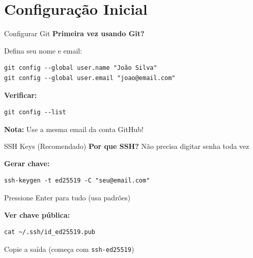 \documentclass[11pt]{beamer}
\begin{document}
\section{Configuração Inicial}

\begin{frame}{Configurar Git}
\textbf{Primeira vez usando Git?}

Defina seu nome e email:

\begin{lstlisting}
git config --global user.name "João Silva"
git config --global user.email "joao@email.com"
\end{lstlisting}

\vspace{0.5cm}

\textbf{Verificar:}
\begin{lstlisting}
git config --list
\end{lstlisting}

\vspace{0.5cm}

\textbf{Nota:} Use a mesma email da conta GitHub!
\end{frame}

\begin{frame}{SSH Keys (Recomendado)}
\textbf{Por que SSH?} Não precisa digitar senha toda vez

\vspace{0.3cm}

\textbf{Gerar chave:}
\begin{lstlisting}
ssh-keygen -t ed25519 -C "seu@email.com"
\end{lstlisting}

Pressione Enter para tudo (usa padrões)

\vspace{0.5cm}

\textbf{Ver chave pública:}
\begin{lstlisting}
cat ~/.ssh/id_ed25519.pub
\end{lstlisting}

\vspace{0.3cm}

Copie a saída (começa com \texttt{ssh-ed25519})
\end{frame}
\end{document}
